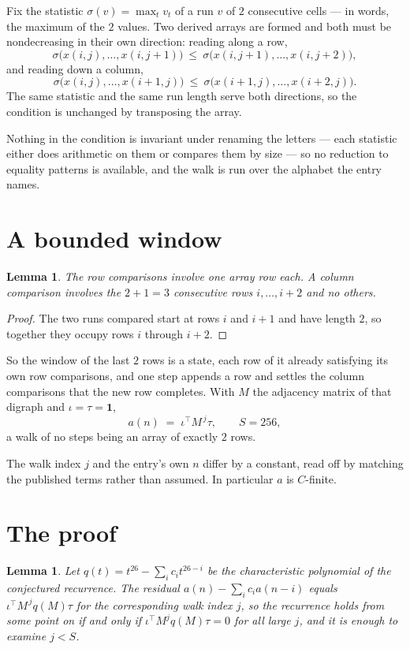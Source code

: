 \documentclass[11pt,a4paper]{article}
\theoremstyle{plain}
\newtheorem{lemma}[theorem]{Lemma}
\theoremstyle{definition}
\begin{document}
Fix the statistic $\sigma(v)=\max_t v_t$ of a run $v$ of $2$ consecutive cells --- in words,
the maximum of the $2$ values. Two derived arrays are formed and both must be
nondecreasing in their own direction: reading along a row,
\[
\sigma\bigl(x(i,j),\dots,x(i,j{+}1)\bigr)\ \le\
\sigma\bigl(x(i,j{+}1),\dots,x(i,j{+}2)\bigr),
\]
and reading down a column,
\[
\sigma\bigl(x(i,j),\dots,x(i{+}1,j)\bigr)\ \le\
\sigma\bigl(x(i{+}1,j),\dots,x(i{+}2,j)\bigr).
\]
The same statistic and the same run length serve both directions, so the condition is
unchanged by transposing the array.

Nothing in the condition is invariant under renaming the letters --- each statistic either does
arithmetic on them or compares them by size --- so no reduction to equality patterns is
available, and the walk is run over the alphabet the entry names.

\section{A bounded window}

\begin{lemma}\label{lem:win}
The row comparisons involve one array row each. A column comparison involves the
$2+1=3$ consecutive rows $i,\dots,i{+}2$ and no others.
\end{lemma}

\begin{proof}
The two runs compared start at rows $i$ and $i+1$ and have length $2$, so together they
occupy rows $i$ through $i+2$.
\end{proof}

So the window of the last $2$ rows is a state, each row of it already satisfying its own row
comparisons, and one step appends a row and settles the column comparisons that the new row
completes. With $M$ the adjacency matrix of that digraph and $\iota=\tau=\mathbf{1}$,
\[
a(n)\;=\;\iota^{\!\top}M^{\,j}\tau ,\qquad S=256,
\]
a walk of no steps being an array of exactly $2$ rows.

The walk index $j$ and the entry's own $n$ differ by a constant, read off by matching the
published terms rather than assumed. In particular $a$ is $C$-finite.

\section{The proof}

\begin{lemma}\label{lem:crit}
Let $q(t)=t^{26}-\sum_i c_it^{26-i}$ be the characteristic polynomial of the
conjectured recurrence. The residual $a(n)-\sum_ic_ia(n-i)$ equals
$\iota^{\!\top}M^{\,j}q(M)\tau$ for the corresponding walk index $j$, so the recurrence
holds from some point on if and only if $\iota^{\!\top}M^{j}q(M)\tau=0$ for all large $j$,
and it is enough to examine $j<S$.
\end{lemma}
\end{document}
